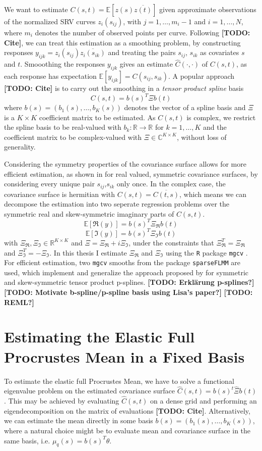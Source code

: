 We want to estimate $C(s,t) = \mathbb{E}[z(s)\overline{z(t)}]$ given approximate observations of the normalized SRV curves $z_i(s_{ij})$, with $j = 1,\dots,m_i-1$ and $i=1,\dots,N$, where $m_i$ denotes the number of observed points per curve.
Following \textbf{[TODO: Cite]}, we can treat this estimation as a smoothing problem, by constructing responses $y_{ijk} = z_i(s_{ij}) \overline{z_i(s_{ik})}$ and treating the pairs $s_{ij}$, $s_{ik}$ as covariates $s$ and $t$.
Smooothing the responses $y_{ijk}$ gives an estimate $\hat C(\cdot, \cdot)$ of $C(s,t)$, as each response has expectation $\mathbb{E}[y_{ijk}] = C(s_{ij},s_{ik})$. 
A popular approach \textbf{[TODO: Cite]} is to carry out the smoothing in a \emph{tensor product spline} basis 
$$ C(s,t) = b(s)^T \Xi b(t) $$
where $b(s) = (b_1(s),\dots,b_K(s))$ denotes the vector of a spline basis and $\Xi$ is a $K \times K$ coefficient matrix to be estimated.
As $C(s,t)$ is complex, we restrict the spline basis to be real-valued with $b_k : \mathbb{R} \rightarrow \mathbb{R}$ for $k = 1,\dots,K$ and the coefficient matrix to be complex-valued with $\Xi \in \mathbb{C}^{K \times K}$, without loss of generality.


Considering the symmetry properties of the covariance surface allows for more efficient estimation, as shown in \cite{CederbaumScheiplGreven2018} for real valued, symmetric covariance surfaces, by considering every unique pair $s_{ij}$,$s_{ik}$ only once.
In the complex case, the covariance surface is hermitian with $C(s,t) = \overline{C(t,s)}$, which means we can decompose the estimation into two seperate regression problems over the symmetric real and skew-symmetric imaginary parts of $C(s,t)$.
$$\mathbb{E}[\Re(y)] = b(s)^T \Xi_{\Re} b(t)$$
$$\mathbb{E}[\Im(y)] = b(s)^T \Xi_{\Im} b(t)$$
with $\Xi_\Re, \Xi_\Im \in \mathbb{R}^{K\times K}$ and $\Xi = \Xi_\Re + i \Xi_\Im$, under the constraints that $\Xi_\Re^T = \Xi_\Re$ and $\Xi_\Im^T = - \Xi_\Im$.
In this thesis I estimate $\Xi_\Re$ and $\Xi_\Im$ using the \texttt{R} \parencite{Rcore} package \texttt{mgcv} \parencite{Wood2017}.
For efficient estimation, two \texttt{mgcv} smooths from the package \texttt{sparseFLMM} \parencite{sparseFLMM} are used, which implement and generalize the approach proposed by \cite{CederbaumScheiplGreven2018} for symmetric and skew-symmetric tensor product p-splines.
\textbf{[TODO: Erklärung p-splines?]}
\textbf{[TODO: Motivate b-spline/p-spline basis using Lisa's paper?]}
\textbf{[TODO: REML?]}


\section{Estimating the Elastic Full Procrustes Mean in a Fixed Basis}
\label{sec:mean_basis}
To estimate the elastic full Procrustes Mean, we have to solve a functional eigenvalue problem on the estimated covariance surface $\hat{C}(s,t) = b(s)^t \hat\Xi b(t)$.
This may be achieved by evaluating $\hat{C}(s,t)$ on a dense grid and performing an eigendecomposition on the matrix of evaluations \textbf{[TODO: Cite]}.
Alternatively, we can estimate the mean directly in some basis $b(s) = (b_1(s),\dots,b_K(s))$, where a natural choice might be to evaluate mean and covariance surface in the same basis, i.e. $\mu_q(s) = b(s)^T \theta$.

